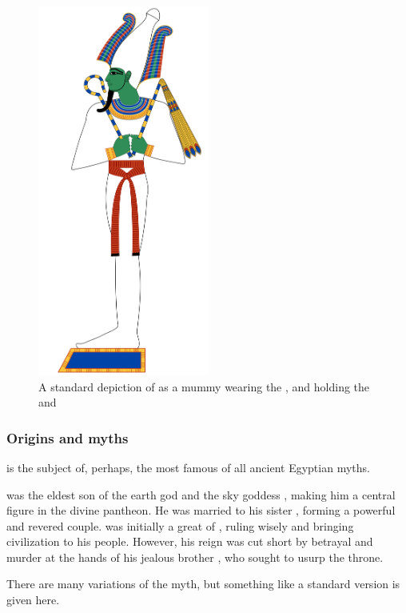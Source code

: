 \begin{figure} [H]
	\centering
	\includegraphics[width=0.5\textwidth]{../images/osiris}
	\caption{A standard depiction of  as a mummy wearing the  , and holding the  and }
\end{figure}

\subsubsection*{Origins and myths}

 is the subject of, perhaps, the most famous of all ancient Egyptian myths.

 was the eldest son of the earth god  and the sky goddess , making him a central figure in the divine pantheon. He was married to his sister , forming a powerful and revered couple.  was initially a great  of , ruling wisely and bringing civilization to his people. However, his reign was cut short by betrayal and murder at the hands of his jealous brother , who sought to usurp the throne.

There are many variations of the myth, but something like a standard version is given here.

